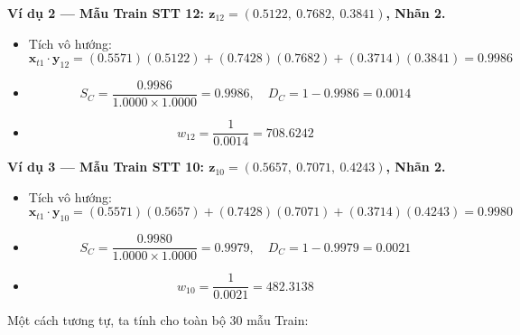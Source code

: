 \documentclass[12pt,a4paper]{article}
\begin{document}
\textbf{Ví dụ 2 — Mẫu Train STT 12: $\mathbf{z}_{12} = (0.5122,\ 0.7682,\ 0.3841)$, Nhãn 2.}
\begin{itemize}
    \item Tích vô hướng:
    \[
        \mathbf{x}_{t1} \cdot \mathbf{y}_{12}
        = (0.5571)(0.5122) + (0.7428)(0.7682) + (0.3714)(0.3841) = 0.9986
    \]
    \item
    \[
        S_C = \frac{0.9986}{1.0000 \times 1.0000} = 0.9986, \quad
        D_C = 1 - 0.9986 = 0.0014
    \]
    \item
    \[
        w_{12} = \frac{1}{0.0014} = 708.6242
    \]
\end{itemize}
 
\textbf{Ví dụ 3 — Mẫu Train STT 10: $\mathbf{z}_{10} = (0.5657,\ 0.7071,\ 0.4243)$, Nhãn 2.}
\begin{itemize}
    \item Tích vô hướng:
    \[
        \mathbf{x}_{t1} \cdot \mathbf{y}_{10}
        = (0.5571)(0.5657) + (0.7428)(0.7071) + (0.3714)(0.4243) = 0.9980
    \]
    \item
    \[
        S_C = \frac{0.9980}{1.0000 \times 1.0000} = 0.9979, \quad
        D_C = 1 - 0.9979 = 0.0021
    \]
    \item
    \[
        w_{10} = \frac{1}{0.0021} = 482.3138
    \]
\end{itemize}
 
Một cách tương tự, ta tính cho toàn bộ 30 mẫu Train:
 
\end{document}
